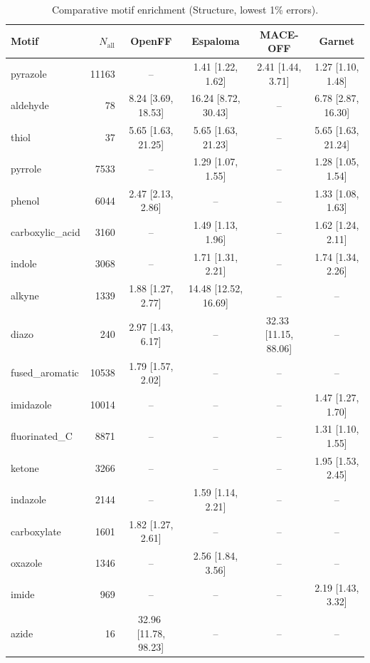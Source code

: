 \begin{table}[h!]
  \centering
  \small
  \setlength{\tabcolsep}{5pt}
  \renewcommand{\arraystretch}{1.15}
  \begin{tabular}{l r c c c c}
    \hline
    Motif & $N_\mathrm{all}$ & OpenFF & Espaloma & MACE-OFF & Garnet \\
    \hline
    pyrazole & 11163 & -- & 1.41\,\,[1.22, 1.62] & 2.41\,\,[1.44, 3.71] & 1.27\,\,[1.10, 1.48] \\
    aldehyde & 78 & 8.24\,\,[3.69, 18.53] & 16.24\,\,[8.72, 30.43] & -- & 6.78\,\,[2.87, 16.30] \\
    thiol & 37 & 5.65\,\,[1.63, 21.25] & 5.65\,\,[1.63, 21.23] & -- & 5.65\,\,[1.63, 21.24] \\
    \hdashline
    pyrrole & 7533 & -- & 1.29\,\,[1.07, 1.55] & -- & 1.28\,\,[1.05, 1.54] \\
    phenol & 6044 & 2.47\,\,[2.13, 2.86] & -- & -- & 1.33\,\,[1.08, 1.63] \\
    carboxylic\_acid & 3160 & -- & 1.49\,\,[1.13, 1.96] & -- & 1.62\,\,[1.24, 2.11] \\
    indole & 3068 & -- & 1.71\,\,[1.31, 2.21] & -- & 1.74\,\,[1.34, 2.26] \\
    alkyne & 1339 & 1.88\,\,[1.27, 2.77] & 14.48\,\,[12.52, 16.69] & -- & -- \\
    diazo & 240 & 2.97\,\,[1.43, 6.17] & -- & 32.33\,\,[11.15, 88.06] & -- \\
    \hdashline
    fused\_aromatic & 10538 & 1.79\,\,[1.57, 2.02] & -- & -- & -- \\
    imidazole & 10014 & -- & -- & -- & 1.47\,\,[1.27, 1.70] \\
    fluorinated\_C & 8871 & -- & -- & -- & 1.31\,\,[1.10, 1.55] \\
    ketone & 3266 & -- & -- & -- & 1.95\,\,[1.53, 2.45] \\
    indazole & 2144 & -- & 1.59\,\,[1.14, 2.21] & -- & -- \\
    carboxylate & 1601 & 1.82\,\,[1.27, 2.61] & -- & -- & -- \\
    oxazole & 1346 & -- & 2.56\,\,[1.84, 3.56] & -- & -- \\
    imide & 969 & -- & -- & -- & 2.19\,\,[1.43, 3.32] \\
    azide & 16 & 32.96\,\,[11.78, 98.23] & -- & -- & -- \\
    \hline
  \end{tabular}
  \caption{Comparative motif enrichment (Structure, lowest 1\% errors).}
  \label{tab:compare_structure_best}
\end{table}